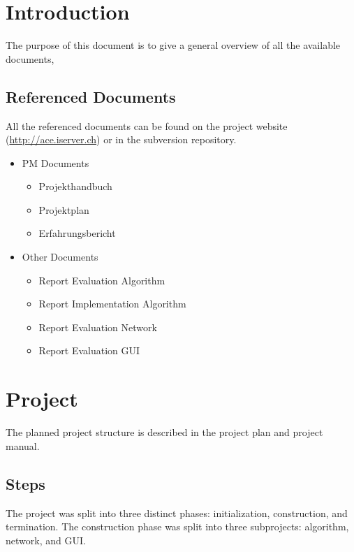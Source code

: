 \documentclass[11pt,a4paper]{article}
\begin{document}
\setlength{\parindent}{0pt}


\newpage

\tableofcontents
\newpage

\listoftables
\listoffigures
\newpage


\section{Introduction}
The purpose of this document is to give a general overview of all the available documents, 

\subsection{Referenced Documents}
All the referenced documents can be found on the project website (\href{http://ace.iserver.ch/}{http://ace.iserver.ch}) or in the subversion repository.
\begin{itemize}
 \item PM Documents
 \begin{itemize}
  \item Projekthandbuch
  \item Projektplan
  \item Erfahrungsbericht
 \end{itemize}
 \item Other Documents
 \begin{itemize}
  \item Report Evaluation Algorithm
  \item Report Implementation Algorithm
  \item Report Evaluation Network
  \item Report Evaluation GUI
 \end{itemize}
\end{itemize}


\section{Project}
The planned project structure is described in the project plan and project manual.

\subsection{Steps}
The project was split into three distinct phases: initialization, construction, and termination. The construction phase was split into three subprojects: algorithm, network, and GUI.
\end{document}
